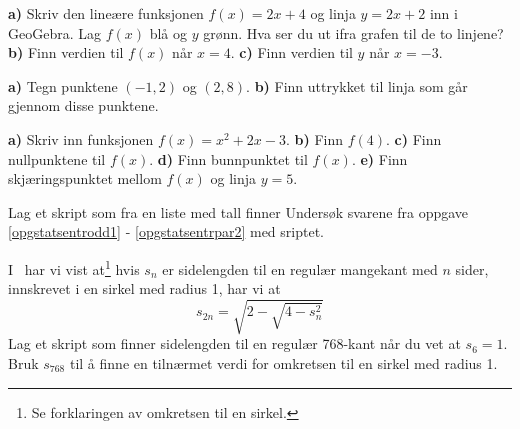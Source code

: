 





\nes

\textbf{a)} Skriv den lineære funksjonen $ {f(x)=2x+4} $ og linja $ {y=2x+2} $ inn i GeoGebra. Lag $ f(x) $ blå og $ y $ grønn. Hva ser du ut ifra grafen til de to linjene?\bs
\textbf{b)} Finn verdien til $ f(x) $ når $ {x=4} $.\bs
\textbf{c)} Finn verdien til $ y $ når $ {x=-3} $.\vsk

\textbf{a)} Tegn punktene $ (-1,2) $ og $ (2,8) $.\bs
\textbf{b)} Finn uttrykket til linja som går gjennom disse punktene.\vsk

\textbf{a)} Skriv inn funksjonen $ {f(x)=x^2+2x-3} $.\bs
\textbf{b)} Finn $ f(4) $.\bs
\textbf{c)} Finn nullpunktene til $ f(x) $.\bs
\textbf{d)} Finn bunnpunktet til $ f(x) $.\bs
\textbf{e)} Finn skjæringspunktet mellom $ f(x) $ og linja $ y=5 $.



\newpage
{}
Lag et skript som fra en liste med tall finner
Undersøk svarene fra {\color{blue}oppgave \ref{opgstatsentrodd1} - \ref{opgstatsentrpar2}} med sriptet.

I \mb\ har vi vist at\footnote{Se forklaringen av omkretsen til en sirkel.} hvis $ s_n $ er sidelengden til en regulær mangekant med $ n $ sider, innskrevet i en sirkel med radius 1, har vi at
\[ s_{2n}=\sqrt{2-\sqrt{4-s_n^2}} \]
Lag et skript som finner sidelengden til en regulær 768-kant når du vet at $ s_6=1 $. Bruk $ s_{768} $ til å finne en tilnærmet verdi for omkretsen til en sirkel med radius 1.




